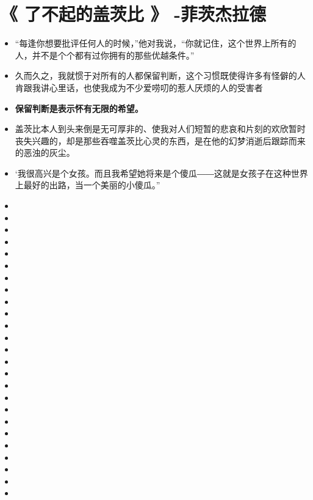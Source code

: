 \documentclass[UTF8,a4paper,8pt]{ctexbook}
\begin{document}
\section{《 了不起的盖茨比 》 -菲茨杰拉德  }
	\begin{itemize}
		\item “每逢你想要批评任何人的时候，”他对我说，“你就记住，这个世界上所有的人，并不是个个都有过你拥有的那些优越条件。”
		\item 久而久之，我就惯于对所有的人都保留判断，这个习惯既使得许多有怪僻的人肯跟我讲心里话，也使我成为不少爱唠叨的惹人厌烦的人的受害者
		\item \textbf{保留判断是表示怀有无限的希望。}
		\item 盖茨比本人到头来倒是无可厚非的、使我对人们短暂的悲哀和片刻的欢欣暂时丧失兴趣的，却是那些吞噬盖茨比心灵的东西，是在他的幻梦消逝后跟踪而来的恶浊的灰尘。
		\item ‘我很高兴是个女孩。而且我希望她将来是个傻瓜――这就是女孩子在这种世界上最好的出路，当一个美丽的小傻瓜。”
		\item
		\item 
		\item 
		\item 
		\item 
		\item 
		\item 
		\item 
		\item 
		\item 
		\item 
		\item 
		\item 
		\item 
		\item 
		\item 
		\item 
		\item 
		\item 
		\item 
		\item 
		\item 
		\item 
		\item 
		\item  
	\end{itemize}

\newpage 
\end{document}
